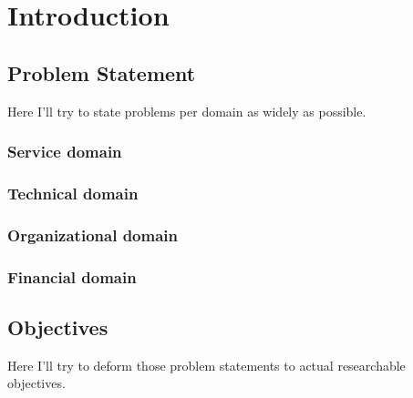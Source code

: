 \documentclass[signatures]{Thesis}
\begin{document}




\tableofcontents
\newpage





\chapter{Introduction}
  \section{Problem Statement}
  Here I'll try to state problems per domain as widely as possible.
    \subsection{Service domain}
    \subsection{Technical domain}
    \subsection{Organizational domain}
    \subsection{Financial domain}
  \section{Objectives}
  	Here I'll try to deform those problem statements to actual researchable objectives.
\end{document}

